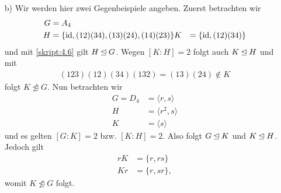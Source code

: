 \begin{loes}
\begin{enumerate}
		 \item[b)] 
		 Wir werden hier zwei Gegenbeispiele angeben.
		 Zuerst betrachten wir 
		 \begin{align*}
		 G &= A_4\\
		 H &= \lbrace \operatorname{id} , (12)(34),(13)(24),(14)(23) \rbrace
		 K &= \lbrace \operatorname{id} , (12)(34) \rbrace
		 \end{align*}
		 und mit \ref{skript:4.6} gilt $ H \unlhd G $.
		 Wegen $ [K:H] = 2 $ folgt auch $ K \unlhd H $ und mit
		 \begin{align*}
		 (123)(12)(34)(132) = (13) (24) \notin K
		 \end{align*}
		 folgt $ K \ntrianglelefteq G $.
		 Nun betrachten wir 
		 \begin{align*}
		 G  = D_4 &= \langle r,s \rangle\\
		 H   &= \langle r^2,s \rangle\\
		 K &= \langle s \rangle
		 \end{align*}
		 und es gelten
		 $ [G : K] = 2 $ bzw. $ [K:H] = 2 $.
		 Also folgt $ G \unlhd K $ und $ K \unlhd H $.
		 Jedoch gilt
		 \begin{align*}
		 r K &= \lbrace r, rs \rbrace\\
		 K r &= \lbrace r , sr \rbrace,
		 \end{align*}
		 womit $ K \ntrianglelefteq G  $ folgt.
		 
	\end{enumerate}

\end{loes}


